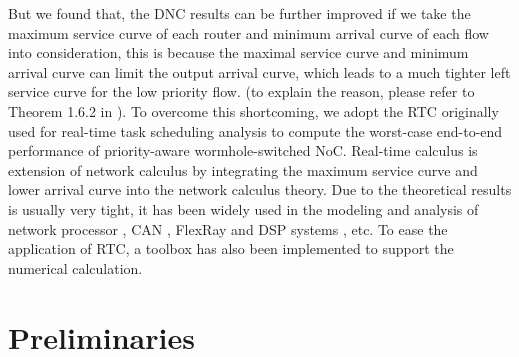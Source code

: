 \documentclass[10pt,journal]{IEEEtran}
\begin{document}
But we found that, the DNC results can be further improved if we take the maximum service curve of each router and minimum arrival curve of each flow into consideration, this is because the maximal service curve and minimum arrival curve can limit the output arrival curve, which leads to a much tighter left service curve for the low priority flow. (to explain the reason, please refer to Theorem 1.6.2 in \cite{Boudec2001Network}). To overcome this shortcoming, we adopt the RTC \cite{ThCN00}\cite{1253607} originally used for real-time task scheduling analysis to compute the worst-case end-to-end performance of priority-aware wormhole-switched NoC. Real-time calculus is extension of network calculus by integrating the maximum service curve and lower arrival curve into the network calculus theory. Due to the theoretical results is usually very tight, it has been widely used in the modeling and analysis of network processor \cite{1253838}, CAN \cite{4617308}, FlexRay \cite{Chokshi:2010:PAF:1774088.1774162}\cite{Hagiescu:2007:PAF:1278480.1278554} and DSP systems \cite{thiele2005performance}, etc. To ease the application of RTC, a toolbox \cite{rtc} has also been implemented to support the numerical calculation.

\section{Preliminaries}\label{model}
\end{document}
